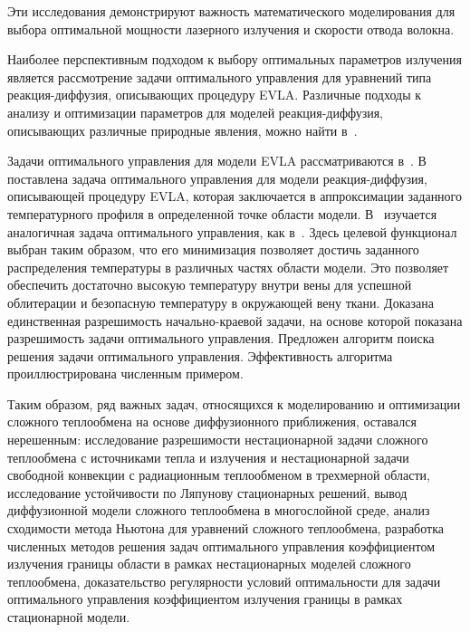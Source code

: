 Эти исследования демонстрируют важность математического моделирования
для выбора оптимальной мощности лазерного излучения и скорости отвода волокна.

Наиболее перспективным подходом к выбору оптимальных параметров
излучения является рассмотрение задачи оптимального управления
для уравнений типа реакция-диффузия, описывающих процедуру EVLA.
Различные подходы к анализу и оптимизации параметров для моделей реакция-диффузия,
описывающих различные природные явления, можно найти в~\cite{
Stability_Alekseev2016, Optimization_Brizitskii2018,
chebotarev2018inverse, Theoretical_Maslovskaya2021
}.

Задачи оптимального управления для модели EVLA рассматриваются в~\cite{
    Optimal_Kovtanyuk2020,Inverse_Kovtanyuk2021 }.
В~\cite{Optimal_Kovtanyuk2020} поставлена задача оптимального управления для модели реакция-диффузия,
описывающей процедуру EVLA, которая заключается в аппроксимации заданного
температурного профиля в определенной точке области модели.
В~\cite{Inverse_Kovtanyuk2021} изучается аналогичная задача оптимального управления,
как в~\cite{Optimal_Kovtanyuk2020}.
Здесь целевой функционал выбран таким образом, что его минимизация позволяет
достичь заданного распределения температуры в различных частях области модели.
Это позволяет обеспечить достаточно высокую температуру внутри
вены для успешной облитерации и безопасную температуру в окружающей вену ткани.
Доказана единственная разрешимость начально-краевой задачи,
на основе которой показана разрешимость задачи оптимального управления.
Предложен алгоритм поиска решения задачи оптимального управления.
Эффективность алгоритма проиллюстрирована численным примером.



Таким образом, ряд важных задач, относящихся к моделированию и
оптимизации сложного теплообмена на основе
диффузионного приближения, оставался нерешенным: исследование
разрешимости нестационарной задачи сложного
теплообмена с источниками тепла и излучения и нестационарной задачи
свободной конвекции с радиационным теплообменом в трехмерной
области, исследование устойчивости по Ляпунову стационарных решений,
вывод диффузионной модели сложного теплообмена в многослойной среде,
анализ сходимости метода Ньютона
для уравнений сложного теплообмена, разработка численных
методов решения задач оптимального управления
коэффициентом излучения границы области в рамках нестационарных моделей
сложного теплообмена, доказательство регулярности
условий оптимальности для задачи оптимального управления коэффициентом
излучения границы в рамках стационарной модели.

